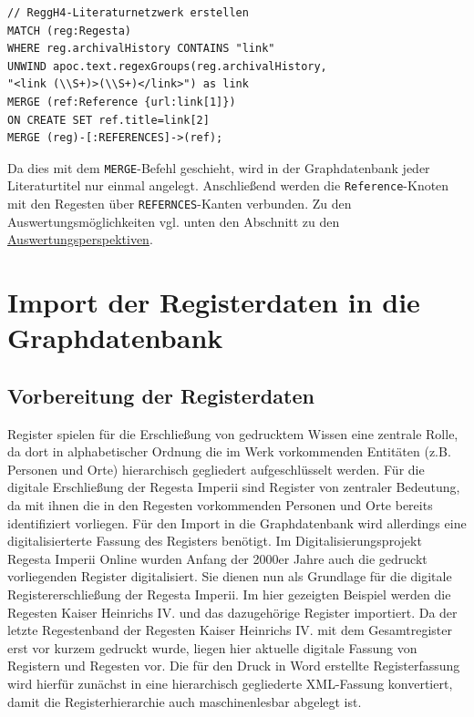 \documentclass[ngerman,]{scrreprt}
\begin{document}
\begin{verbatim}
// ReggH4-Literaturnetzwerk erstellen
MATCH (reg:Regesta)
WHERE reg.archivalHistory CONTAINS "link"
UNWIND apoc.text.regexGroups(reg.archivalHistory,
"<link (\\S+)>(\\S+)</link>") as link
MERGE (ref:Reference {url:link[1]})
ON CREATE SET ref.title=link[2]
MERGE (reg)-[:REFERENCES]->(ref);
\end{verbatim}

Da dies mit dem \texttt{MERGE}-Befehl geschieht, wird in der Graphdatenbank jeder Literaturtitel nur einmal angelegt. Anschließend werden die \texttt{Reference}-Knoten mit den Regesten über \texttt{REFERNCES}-Kanten verbunden. Zu den Auswertungsmöglichkeiten vgl. unten den Abschnitt zu den \protect\hyperlink{ux5cux23Auswertungsperspektiven}{Auswertungsperspektiven}.

\chapter{Import der Registerdaten in die Graphdatenbank}\label{import-der-registerdaten-in-die-graphdatenbank}

\section{Vorbereitung der Registerdaten}\label{vorbereitung-der-registerdaten}

Register spielen für die Erschließung von gedrucktem Wissen eine zentrale Rolle, da dort in alphabetischer Ordnung die im Werk vorkommenden Entitäten (z.B. Personen und Orte) hierarchisch gegliedert aufgeschlüsselt werden. Für die digitale Erschließung der Regesta Imperii sind Register von zentraler Bedeutung, da mit ihnen die in den Regesten vorkommenden Personen und Orte bereits identifiziert vorliegen. Für den Import in die Graphdatenbank wird allerdings eine digitalisierterte Fassung des Registers benötigt. Im Digitalisierungsprojekt Regesta Imperii Online wurden Anfang der 2000er Jahre auch die gedruckt vorliegenden Register digitalisiert. Sie dienen nun als Grundlage für die digitale Registererschließung der Regesta Imperii. Im hier gezeigten Beispiel werden die Regesten Kaiser Heinrichs IV. und das dazugehörige Register importiert. Da der letzte Regestenband der Regesten Kaiser Heinrichs IV. mit dem Gesamtregister erst vor kurzem gedruckt wurde, liegen hier aktuelle digitale Fassung von Registern und Regesten vor. Die für den Druck in Word erstellte Registerfassung wird hierfür zunächst in eine hierarchisch gegliederte XML-Fassung konvertiert, damit die Registerhierarchie auch maschinenlesbar abgelegt ist.
\end{document}
